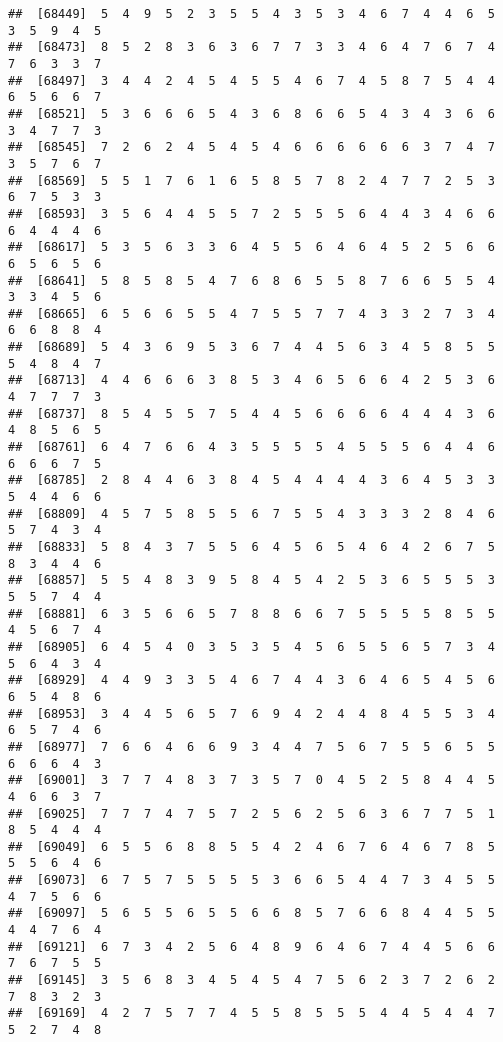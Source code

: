 \documentclass[
]{book}
\begin{document}
\begin{verbatim}
##  [68449]  5  4  9  5  2  3  5  5  4  3  5  3  4  6  7  4  4  6  5  3  5  9  4  5
##  [68473]  8  5  2  8  3  6  3  6  7  7  3  3  4  6  4  7  6  7  4  7  6  3  3  7
##  [68497]  3  4  4  2  4  5  4  5  5  4  6  7  4  5  8  7  5  4  4  6  5  6  6  7
##  [68521]  5  3  6  6  6  5  4  3  6  8  6  6  5  4  3  4  3  6  6  3  4  7  7  3
##  [68545]  7  2  6  2  4  5  4  5  4  6  6  6  6  6  6  3  7  4  7  3  5  7  6  7
##  [68569]  5  5  1  7  6  1  6  5  8  5  7  8  2  4  7  7  2  5  3  6  7  5  3  3
##  [68593]  3  5  6  4  4  5  5  7  2  5  5  5  6  4  4  3  4  6  6  6  4  4  4  6
##  [68617]  5  3  5  6  3  3  6  4  5  5  6  4  6  4  5  2  5  6  6  6  5  6  5  6
##  [68641]  5  8  5  8  5  4  7  6  8  6  5  5  8  7  6  6  5  5  4  3  3  4  5  6
##  [68665]  6  5  6  6  5  5  4  7  5  5  7  7  4  3  3  2  7  3  4  6  6  8  8  4
##  [68689]  5  4  3  6  9  5  3  6  7  4  4  5  6  3  4  5  8  5  5  5  4  8  4  7
##  [68713]  4  4  6  6  6  3  8  5  3  4  6  5  6  6  4  2  5  3  6  4  7  7  7  3
##  [68737]  8  5  4  5  5  7  5  4  4  5  6  6  6  6  4  4  4  3  6  4  8  5  6  5
##  [68761]  6  4  7  6  6  4  3  5  5  5  5  4  5  5  5  6  4  4  6  6  6  6  7  5
##  [68785]  2  8  4  4  6  3  8  4  5  4  4  4  4  3  6  4  5  3  3  5  4  4  6  6
##  [68809]  4  5  7  5  8  5  5  6  7  5  5  4  3  3  3  2  8  4  6  5  7  4  3  4
##  [68833]  5  8  4  3  7  5  5  6  4  5  6  5  4  6  4  2  6  7  5  8  3  4  4  6
##  [68857]  5  5  4  8  3  9  5  8  4  5  4  2  5  3  6  5  5  5  3  5  5  7  4  4
##  [68881]  6  3  5  6  6  5  7  8  8  6  6  7  5  5  5  5  8  5  5  4  5  6  7  4
##  [68905]  6  4  5  4  0  3  5  3  5  4  5  6  5  5  6  5  7  3  4  5  6  4  3  4
##  [68929]  4  4  9  3  3  5  4  6  7  4  4  3  6  4  6  5  4  5  6  6  5  4  8  6
##  [68953]  3  4  4  5  6  5  7  6  9  4  2  4  4  8  4  5  5  3  4  6  5  7  4  6
##  [68977]  7  6  6  4  6  6  9  3  4  4  7  5  6  7  5  5  6  5  5  6  6  6  4  3
##  [69001]  3  7  7  4  8  3  7  3  5  7  0  4  5  2  5  8  4  4  5  4  6  6  3  7
##  [69025]  7  7  7  4  7  5  7  2  5  6  2  5  6  3  6  7  7  5  1  8  5  4  4  4
##  [69049]  6  5  5  6  8  8  5  5  4  2  4  6  7  6  4  6  7  8  5  5  5  6  4  6
##  [69073]  6  7  5  7  5  5  5  5  3  6  6  5  4  4  7  3  4  5  5  4  7  5  6  6
##  [69097]  5  6  5  5  6  5  5  6  6  8  5  7  6  6  8  4  4  5  5  4  4  7  6  4
##  [69121]  6  7  3  4  2  5  6  4  8  9  6  4  6  7  4  4  5  6  6  7  6  7  5  5
##  [69145]  3  5  6  8  3  4  5  4  5  4  7  5  6  2  3  7  2  6  2  7  8  3  2  3
##  [69169]  4  2  7  5  7  7  4  5  5  8  5  5  5  4  4  5  4  4  7  5  2  7  4  8

\end{verbatim}
\end{document}
